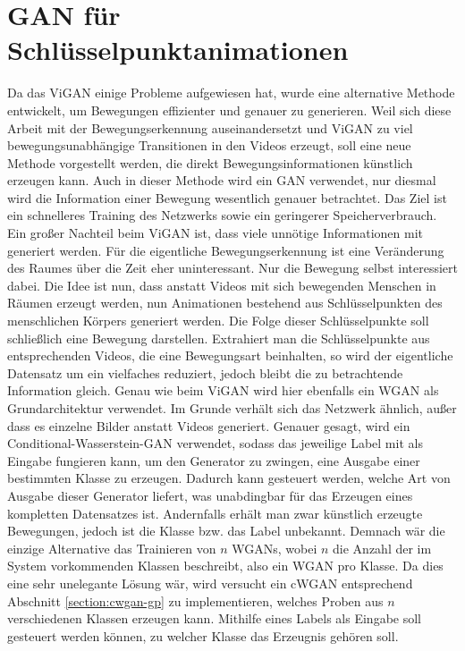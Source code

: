 \section{GAN für Schlüsselpunktanimationen}
Da das ViGAN einige Probleme aufgewiesen hat, wurde eine alternative Methode
entwickelt, um Bewegungen effizienter und genauer zu generieren. Weil sich diese
Arbeit mit der Bewegungserkennung auseinandersetzt und ViGAN zu viel
bewegungsunabhängige Transitionen in den Videos erzeugt, soll eine neue Methode
vorgestellt werden, die direkt Bewegungsinformationen künstlich erzeugen kann.
Auch in dieser Methode wird ein GAN verwendet, nur diesmal wird die Information
einer Bewegung wesentlich genauer betrachtet. Das Ziel ist ein schnelleres
Training des Netzwerks sowie ein geringerer Speicherverbrauch. Ein großer
Nachteil beim ViGAN ist, dass viele unnötige Informationen mit generiert werden.
Für die eigentliche Bewegungserkennung ist eine Veränderung des Raumes über die
Zeit eher uninteressant. Nur die Bewegung selbst interessiert dabei.
Die Idee ist nun, dass anstatt Videos mit sich bewegenden Menschen in Räumen erzeugt werden, nun Animationen
bestehend aus Schlüsselpunkten des menschlichen Körpers generiert werden. Die
Folge dieser Schlüsselpunkte soll schließlich eine Bewegung darstellen.
Extrahiert man die Schlüsselpunkte aus entsprechenden Videos, die eine
Bewegungsart beinhalten, so wird der eigentliche Datensatz um ein vielfaches
reduziert, jedoch bleibt die zu betrachtende Information gleich. Genau
wie beim ViGAN wird hier ebenfalls ein WGAN als Grundarchitektur verwendet. Im
Grunde verhält sich das Netzwerk ähnlich, außer dass es einzelne
Bilder anstatt Videos generiert. Genauer gesagt, wird ein
Conditional-Wasserstein-GAN verwendet, sodass das jeweilige Label mit als
Eingabe fungieren kann, um den Generator zu zwingen, eine Ausgabe einer
bestimmten Klasse zu erzeugen. Dadurch kann gesteuert werden, welche Art von
Ausgabe dieser Generator liefert, was unabdingbar für das Erzeugen eines
kompletten Datensatzes ist. Andernfalls erhält man zwar künstlich erzeugte
Bewegungen, jedoch ist die Klasse bzw. das Label unbekannt. Demnach wär die
einzige Alternative das Trainieren von $n$ WGANs, wobei $n$ die Anzahl der im
System vorkommenden Klassen beschreibt, also ein WGAN pro Klasse. Da dies eine
sehr unelegante Lösung wär, wird versucht ein cWGAN entsprechend Abschnitt
\ref{section:cwgan-gp} zu implementieren, welches Proben aus $n$ verschiedenen
Klassen erzeugen kann. Mithilfe eines Labels als Eingabe soll gesteuert werden
können, zu welcher Klasse das Erzeugnis gehören soll.

